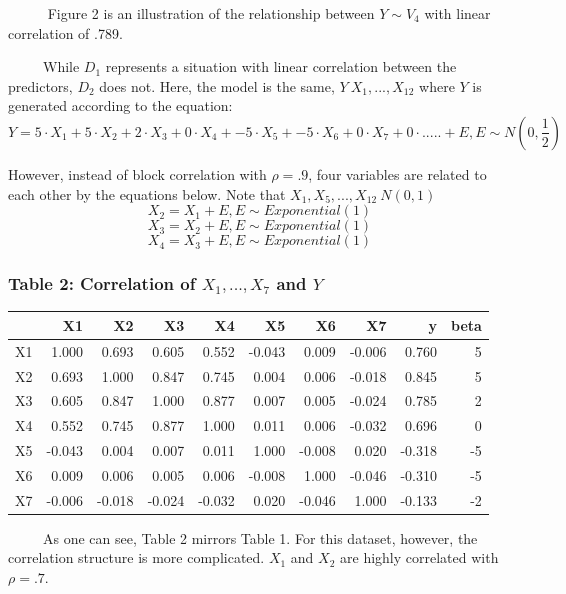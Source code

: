 \documentclass[12pt,twoside]{reedthesis}
\begin{document}
  ~~~~~ Figure 2 is an illustration of the relationship between
  \(Y\sim V_4\) with linear correlation of .789.
  
  ~~~~~While \(D_1\) represents a situation with linear correlation
  between the predictors, \(D_2\) does not. Here, the model is the same,
  \(Y~X_1,...,X_12\) where \(Y\) is generated according to the equation:
  \[Y = 5 \cdot X_1 + 5 \cdot X_2 + 2 \cdot X_3 + 0 \cdot X_4 + -5 \cdot X_5 + -5\cdot X_6 + 0\cdot X_7 + 0 \cdot ..... + E, E \sim N(0,\frac 1 2 )\]
  
  However, instead of block correlation with \(\rho = .9\), four variables
  are related to each other by the equations below. Note that
  \(X_1, X_5,...,X_{12} ~ N(0,1)\)
  \[X_2 = X_1 + E, E \sim Exponential(1)\]
  \[X_3 = X_2 + E, E \sim Exponential(1)\]
  \[X_4 = X_3 + E, E \sim Exponential(1)\]
  
  \subsubsection{\texorpdfstring{Table 2: Correlation of \(X_1,..., X_7\)
  and
  \(Y\)}{Table 2: Correlation of X\_1,..., X\_7 and Y}}\label{table-2-correlation-of-x_1...-x_7-and-y}
  
  \begin{tabular}{l|r|r|r|r|r|r|r|r|r}
  \hline
    & X1 & X2 & X3 & X4 & X5 & X6 & X7 & y & beta\\
  \hline
  X1 & 1.000 & 0.693 & 0.605 & 0.552 & -0.043 & 0.009 & -0.006 & 0.760 & 5\\
  \hline
  X2 & 0.693 & 1.000 & 0.847 & 0.745 & 0.004 & 0.006 & -0.018 & 0.845 & 5\\
  \hline
  X3 & 0.605 & 0.847 & 1.000 & 0.877 & 0.007 & 0.005 & -0.024 & 0.785 & 2\\
  \hline
  X4 & 0.552 & 0.745 & 0.877 & 1.000 & 0.011 & 0.006 & -0.032 & 0.696 & 0\\
  \hline
  X5 & -0.043 & 0.004 & 0.007 & 0.011 & 1.000 & -0.008 & 0.020 & -0.318 & -5\\
  \hline
  X6 & 0.009 & 0.006 & 0.005 & 0.006 & -0.008 & 1.000 & -0.046 & -0.310 & -5\\
  \hline
  X7 & -0.006 & -0.018 & -0.024 & -0.032 & 0.020 & -0.046 & 1.000 & -0.133 & -2\\
  \hline
  \end{tabular}
  
  ~~~~~As one can see, Table 2 mirrors Table 1. For this dataset, however,
  the correlation structure is more complicated. \(X_1\) and \(X_2\) are
  highly correlated with \(\rho = .7\).
  
\end{document}
